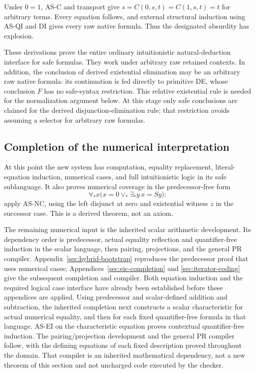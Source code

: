 Under $0=1$, AS-C and transport give
$s=C(0,s,t)=C(1,s,t)=t$ for arbitrary terms. Every equation follows,
and external structural induction using AS-QI and DI gives every raw
native formula. Thus the designated absurdity has explosion.

These derivations prove the entire ordinary intuitionistic
natural-deduction interface for safe formulas. They work under arbitrary
raw retained contexts. In addition, the conclusion of derived
existential elimination may be an arbitrary raw native formula:
its continuation is fed directly to primitive DE, whose conclusion
$F$ has no safe-syntax restriction. This relative existential rule is
needed for the normalization argument below. At this stage only safe
conclusions are claimed for the derived disjunction-elimination rule;
that restriction avoids assuming a selector for arbitrary raw formulas.

\subsection{Completion of the numerical interpretation}

At this point the new system has computation, equality replacement,
literal-equation induction, numerical cases, and full intuitionistic
logic in its safe sublanguage. It also proves numerical coverage in
the predecessor-free form
\[
 \forall_*x\bigl(x=0\vee_*\exists_*y\,x=Sy\bigr):
\]
apply AS-NC, using the left disjunct at zero and existential witness
$z$ in the successor case. This is a derived theorem, not an axiom.

The remaining numerical input is the inherited scalar arithmetic
development. Its dependency order is predecessor, actual equality
reflection and quantifier-free induction in the scalar language,
then pairing, projections, and the general PR compiler.
Appendix~\ref{sec:hybrid-bootstrap} reproduces the predecessor proof
that uses numerical cases; Appendices~\ref{sec:eic-completion} and
\ref{sec:iterator-coding} give the subsequent completion and compiler.
Both equation induction and the required logical case interface have
already been established before these appendices are applied. Using
predecessor and scalar-defined addition and subtraction, the inherited
completion next constructs a scalar characteristic for actual numerical
equality, and then for each fixed quantifier-free formula in that
language. AS-EI on the characteristic equation proves contextual
quantifier-free induction. The pairing/projection development and the
general PR compiler follow, with the defining equations of each fixed
description proved throughout the domain. That compiler is an inherited
mathematical dependency, not a new theorem of this section and not
uncharged code executed by the checker.

